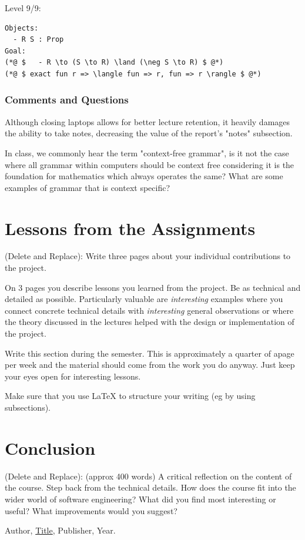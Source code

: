 \documentclass{article}
\theoremstyle{theorem}
\theoremstyle{definition}
\theoremstyle{remark}
\begin{document}
Level 9/9:
\begin{lstlisting}
Objects:
  - R S : Prop
Goal:
(*@ $   - R \to (S \to R) \land (\neg S \to R) $ @*)
(*@ $ exact fun r => \langle fun => r, fun => r \rangle $ @*)
\end{lstlisting}

\subsubsection*{Comments and Questions}

Although closing laptops allows for better lecture retention, it heavily damages the ability to take notes, decreasing the value of the report's "notes" subsection.

In class, we commonly hear the term "context-free grammar", is it not the case where all grammar within computers should be context free considering it is the foundation for mathematics which always operates the same? What are some examples of grammar that is context specific?

\section{Lessons from the Assignments}

(Delete and Replace): Write three pages about your individual contributions to the project.

On 3 pages you describe lessons you learned from the project. Be as technical and detailed as possible. Particularly valuable are \emph{interesting} examples where you connect concrete technical details with \emph{interesting} general observations or where the theory discussed in the lectures helped with the design or implementation of the project.

Write this section during the semester. This is approximately a quarter of apage per week and the material should come from the work you do anyway. Just keep your eyes open for interesting lessons.

Make sure that you use \LaTeX{} to structure your writing (eg by using subsections).

\section{Conclusion}\label{conclusion}

(Delete and Replace): (approx 400 words) A critical reflection on the content of the course. Step back from the technical details. How does the course fit into the wider world of software engineering? What did you find most interesting or useful? What improvements would you suggest?

\begin{thebibliography}{99}
 Author, \href{https://en.wikipedia.org/wiki/LaTeX}{Title}, Publisher, Year.
\end{thebibliography}
\end{document}
